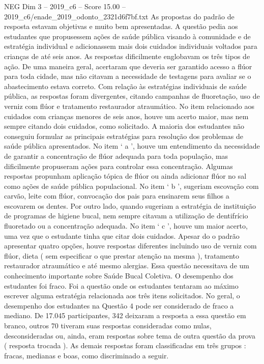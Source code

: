 \begin{textsample}{NEG Dim 3 – 2019\_c6 – Score 15.00 – 2019\_c6/enade\_2019\_odonto\_2321d6f7bf.txt}
As propostas do padrão de resposta estavam objetivas e muito bem apresentadas.
A questão pedia aos estudantes que propusessem ações de saúde pública visando à comunidade e de estratégia individual e adicionassem mais dois cuidados individuais voltados para crianças de até seis anos.
As respostas dificilmente englobavam os três tipos de ação.
De uma maneira geral, acertaram que deveria ser garantido acesso a flúor para toda cidade, mas não citavam a necessidade de testagens para avaliar se o abastecimento estava correto.
Com relação às estratégias individuais de saúde pública, as respostas foram divergentes, citando campanhas de fluoretação, uso de verniz com flúor e tratamento restaurador atraumático.
No item relacionado aos cuidados com crianças menores de seis anos, houve um acerto maior, mas nem sempre citando dois cuidados, como solicitado.
A maioria dos estudantes não conseguiu formular as principais estratégias para resolução dos problemas de saúde pública apresentados.
No item ‘ a ’, houve um entendimento da necessidade de garantir a concentração de flúor adequada para toda população, mas dificilmente propuseram ações para controlar essa concentração.
Algumas respostas propunham aplicação tópica de flúor ou ainda adicionar flúor no sal como ações de saúde pública populacional.
No item ‘ b ’, sugeriam escovação com carvão, leite com flúor, convocação dos pais para ensinarem seus filhos a escovarem os dentes.
Por outro lado, quando sugeriam a estratégia de instituição de programas de higiene bucal, nem sempre citavam a utilização de dentifrício fluoretado ou a concentração adequada.
No item ‘ c ’, houve um maior acerto, uma vez que o estudante tinha que citar dois cuidados.
Apesar do o padrão apresentar quatro opções, houve respostas diferentes incluindo uso de verniz com flúor, dieta ( sem especificar o que prestar atenção na mesma ), tratamento restaurador atraumático e até mesmo alergias.
Essa questão necessitava de um conhecimento importante sobre Saúde Bucal Coletiva.
O desempenho dos estudantes foi fraco.
Foi a questão onde os estudantes tentaram ao máximo escrever alguma estratégia relacionada aos três itens solicitados.
No geral, o desempenho dos estudantes na Questão 4 pode ser considerado de fraco a mediano.
De 17.045 participantes, 342 deixaram a resposta a essa questão em branco, outros 70 tiveram suas respostas consideradas como nulas, desconsideradas ou, ainda, eram respostas sobre tema de outra questão da prova ( resposta trocada ).
As demais respostas foram classificadas em três grupos : fracas, medianas e boas, como discriminado a seguir.

\end{textsample}
